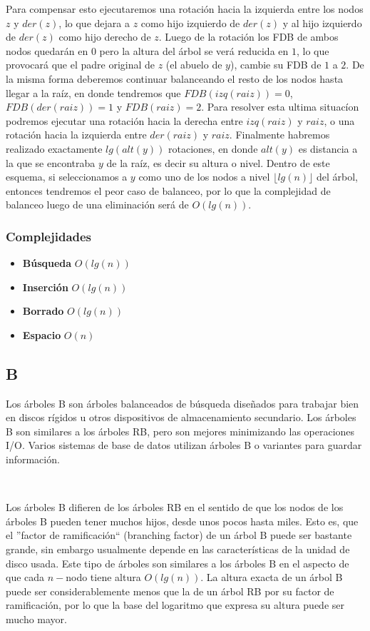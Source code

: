Para compensar esto ejecutaremos una rotaci\'on hacia la izquierda entre los nodos $z$ y $der(z)$, lo que dejara a $z$ como hijo izquierdo de $der(z)$ y al hijo izquierdo de $der(z)$ como hijo derecho de $z$. Luego de la rotaci\'on los FDB de ambos nodos quedar\'an en $0$ pero la altura del \'arbol se ver\'a reducida en $1$, lo que provocar\'a que el padre original de $z$ (el abuelo de $y$), cambie su FDB de $1$ a $2$. De la misma forma deberemos continuar balanceando el resto de los nodos hasta llegar a la ra\'iz, en donde tendremos que $FDB(izq(raiz)) = 0$, $FDB(der(raiz)) = 1$ y $FDB(raiz) = 2$. Para resolver esta ultima situac\'ion podremos ejecutar una rotaci\'on hacia la derecha entre $izq(raiz)$ y $raiz$, o una rotaci\'on hacia la izquierda entre $der(raiz)$ y $raiz$. Finalmente habremos realizado exactamente $lg(alt(y))$ rotaciones, en donde $alt(y)$ es distancia a la que se encontraba $y$ de la ra\'iz, es decir su altura o nivel. Dentro de este esquema, si seleccionamos a $y$ como uno de los nodos a 
nivel $\lfloor lg(n) \rfloor$ del \'arbol, entonces tendremos el peor caso de balanceo, por lo que la complejidad de balanceo luego de una eliminaci\'on ser\'a de $O(lg(n))$.

\subsubsection{Complejidades}

\begin{itemize}
 \item \textbf{B\'usqueda} $O(lg(n))$
 \item \textbf{Inserci\'on} $O(lg(n))$
 \item \textbf{Borrado} $O(lg(n))$
 \item \textbf{Espacio} $O(n)$
\end{itemize}

\subsection{B}

Los \'arboles B son \'arboles balanceados de b\'usqueda dise\~nados para trabajar bien en discos r\'igidos u otros dispositivos de almacenamiento secundario. Los \'arboles B son similares a los \'arboles RB, pero son mejores minimizando las operaciones I/O. Varios sistemas de base de datos utilizan \'arboles B o variantes para guardar informaci\'on.

~

Los \'arboles B difieren de los \'arboles RB en el sentido de que los nodos de los \'arboles B pueden tener muchos hijos, desde unos pocos hasta miles. Esto es, que el ''factor de ramificaci\'on`` (branching factor) de un \'arbol B puede ser bastante grande, sin embargo usualmente depende en las caracter\'isticas de la unidad de disco usada. Este tipo de \'arboles son similares a los \'arboles B en el aspecto de que cada $n-$nodo tiene altura $O(lg(n))$. La altura exacta de un \'arbol B puede ser considerablemente menos que la de un \'arbol RB por su factor de ramificaci\'on, por lo que la base del logaritmo que expresa su altura puede ser mucho mayor.

